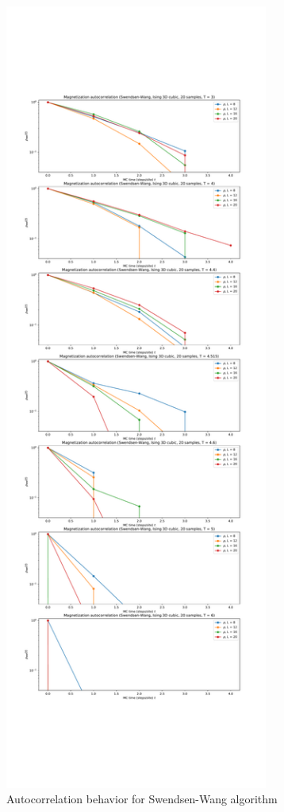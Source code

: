 \documentclass[11pt,a4paper]{article}
\begin{document}
\begin{figure}[b]
	\centering
	\includegraphics[height=26cm]{autocorr_Swendsen_Wang.pdf}
	\caption[short]{Autocorrelation behavior for Swendsen-Wang algorithm}
	\label{fig:3}
\end{figure}
\end{document}
